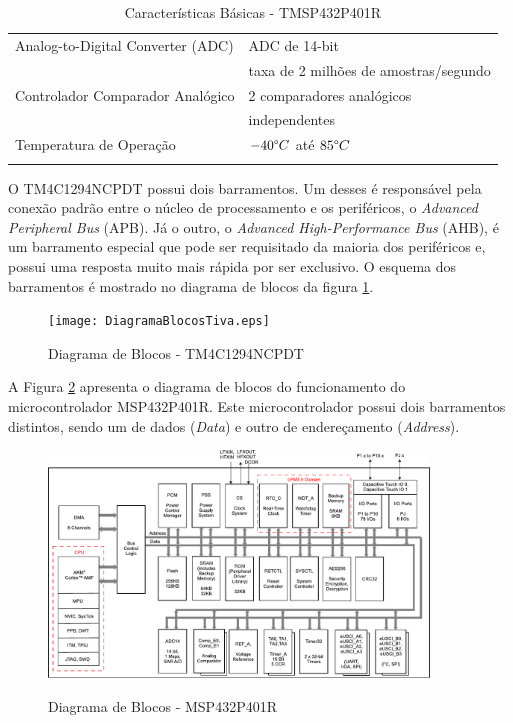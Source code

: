 \begin{longtable}{|l|l|}
	\hline
	Analog-to-Digital Converter (ADC) &  ADC de 14-bit\\
									  & taxa de 2 milhões de amostras/segundo\\
	\hline
	Controlador Comparador Analógico & 2 comparadores analógicos \\
								     & independentes \\
	\hline
	Temperatura de Operação & $-40 \degree C$ até $85 \degree C$ \\
	\hline
	\caption{Características Básicas - TMSP432P401R\texttrademark \cite{DATASHEET_MicroMSP}}
	\label{tab:CaracteristicasMicroMSP}
\end{longtable}


O TM4C1294NCPDT possui dois barramentos. Um desses é responsável pela conexão padrão entre o núcleo de processamento e os periféricos, o \emph{Advanced Peripheral Bus} (APB). Já o outro, o \emph{Advanced High-Performance Bus} (AHB), é um barramento especial que pode ser requisitado da maioria dos periféricos e, possui uma resposta muito mais rápida por ser exclusivo. O esquema dos barramentos é mostrado no diagrama de blocos da figura \ref{fig:DiagramaBlocosTiva}.


\begin{figure}[H]
\centering
\texttt{[image: DiagramaBlocosTiva.eps]}
    \caption{Diagrama de Blocos - TM4C1294NCPDT \cite{DATASHEET_TIVA}}
    \label{fig:DiagramaBlocosTiva}
\end{figure}

A Figura \ref{fig:DiagramaBlocosMSP432} apresenta o diagrama de blocos do funcionamento do microcontrolador MSP432P401R\texttrademark. Este microcontrolador possui dois barramentos distintos, sendo um de dados (\emph{Data})  e outro de endereçamento (\emph{Address}). 

\begin{figure}[H]
	\centering
	\includegraphics[width=0.9\textwidth] {figuras/MSP432P401R-Diagrama.pdf}
	\caption{Diagrama de Blocos - MSP432P401R\texttrademark} \cite{DATASHEET_MicroMSP}
	\label{fig:DiagramaBlocosMSP432}
\end{figure}